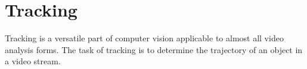 \section{Tracking}
  Tracking is a versatile part of computer vision applicable to almost all video analysis forms.
  The task of tracking is to determine the trajectory of an object in a video stream.
  
  
  
  
  
